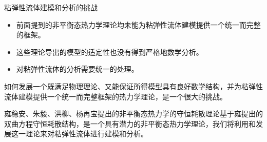 \documentclass[mathserif]{beamer}
\begin{document}
\begin{frame}{粘弹性流体建模和分析的挑战}
\begin{itemize}
\item 前面提到的非平衡态热力学理论均未能为粘弹性流体建模提供一个统一而完整的框架。
\pause
\item 这些理论导出的模型的适定性也没有得到严格地数学分析。
\pause
\item 对粘弹性流体的分析需要统一的处理。
\end{itemize}
\pause

如何发展一个既满足物理理论、又能保证所得模型具有良好数学结构，并为粘弹性流体建模提供一个统一而完整框架的热力学理论，是一个很大的挑战。
\pause

雍稳安、朱毅、洪柳、杨再宝提出的非平衡态热力学的守恒耗散理论基于雍提出的双曲方程守恒耗散结构，是一个具有潜力的非平衡态热力学理论，我们将利用和发展这一理论来对粘弹性流体进行建模和分析。
\end{frame}


\end{document}
